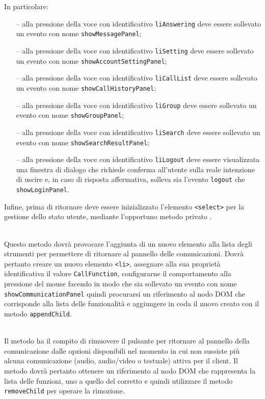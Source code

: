 \begin{description}
  In particolare:
  \begin{itemize}
    \item[--] alla pressione della voce con identificativo \verb'liAnswering' deve essere sollevato un evento con nome \verb'showMessagePanel';
    \item[--] alla pressione della voce con identificativo \verb'liSetting' deve essere sollevato un evento con nome \verb'showAccountSettingPanel';
    \item[--] alla pressione della voce con identificativo \verb'liCallList' deve essere sollevato un evento con nome \verb'showCallHistoryPanel';
    \item[--] alla pressione della voce con identificativo \verb'liGroup' deve essere sollevato un evento con nome \verb'showGroupPanel';
    \item[--] alla pressione della voce con identificativo \verb'liSearch' deve essere sollevato un evento con nome \verb'showSearchResultPanel';
    \item[--] alla pressione della voce con identificativo \verb'liLogout' deve essere visualizzata una finestra di dialogo che richiede conferma all'utente sulla reale intenzione di uscire e, in caso di risposta affermativa, solleva sia l'evento \verb'logout' che \verb'showLoginPanel'.
  \end{itemize}
  
  Infine, prima di ritornare deve essere inizializzato l'elemento \verb'<select>' per la gestione dello stato utente, mediante l'opportuno metodo privato .
  
  \item{}\\
  Questo metodo dovrà provocare l'aggiunta di un nuovo elemento alla lista degli strumenti per permettere di ritornare al pannello delle comunicazioni. Dovrà pertanto creare un nuovo elemento \verb'<li>', assegnare alla sua proprietà identificativa il valore \verb'CallFunction', configurarne il comportamento alla pressione del mouse facendo in modo che sia sollevato un evento con nome \verb'showCommunicationPanel' quindi procurarsi un riferimento al nodo DOM che corrisponde alla lista delle funzionalità e aggiungere in coda il nuovo  creato con il metodo \verb'appendChild'.
  
  \item{}\\
  Il metodo ha il compito di rimuovere il pulsante per ritornare al pannello della comunicazione dalle opzioni disponibili nel momento in cui non sussiste più alcuna comunicazione (audio, audio/video o testuale) attiva per il client. Il metodo dovrà pertanto ottenere un riferimento al nodo DOM che rappresenta la lista delle funzioni, uno a quello del  corretto e quindi utilizzare il metodo \verb'removeChild' per operare la rimozione.
  

\end{description}
